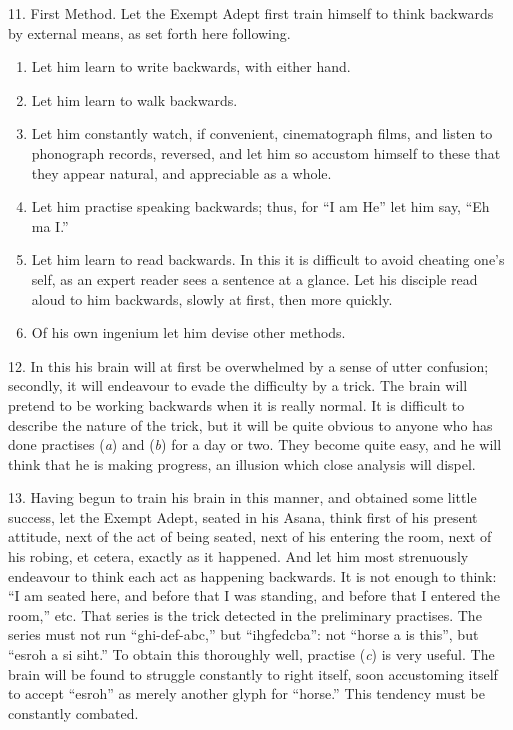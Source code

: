 11. First Method.  Let the Exempt Adept first train himself to think backwards by external means, as set forth here following.
\begin{enumerate}[label=(\alph*)]
\item Let him learn to write backwards, with either hand.
\item Let him learn to walk backwards.
\item Let him constantly watch, if convenient, cinematograph films, and listen to phonograph records, reversed, and let him so accustom himself to these that they appear natural, and appreciable as a whole.
\item Let him practise speaking backwards; thus, for \enquote{I am He} let him say, \enquote{Eh ma I.} 
\item Let him learn to read backwards. In this it is difficult to avoid cheating one’s self, as an expert reader sees a sentence at a glance. Let his disciple read aloud to him backwards, slowly at first, then more quickly.
\item Of his own ingenium let him devise other methods.
\end{enumerate}

12. In this his brain will at first be overwhelmed by a sense of utter confusion; secondly, it will endeavour to evade the difficulty by a trick. The brain will pretend to be working backwards when it is really normal. It is difficult to describe the nature of the trick, but it will be quite obvious to anyone who has done practises (\textit{a}) and (\textit{b}) for a day or two. They become quite easy, and he will think that he is making progress, an illusion which close analysis will dispel.

13. Having begun to train his brain in this manner, and obtained some little success, let the Exempt Adept, seated in his Asana, think first of his present attitude, next of the act of being seated, next of his entering the room, next of his robing, et cetera, exactly as it happened. And let him most strenuously endeavour to think each act as happening backwards. It is not enough to think: \enquote{I am seated here, and before that I was standing, and before that I entered the room,} etc. That series is the trick detected in the preliminary practises.  The series must not run \mbox{\enquote{ghi-def-abc,}} but \mbox{\enquote{ihgfedcba}}: not \enquote{horse a is this}, but \enquote{esroh a si siht.} To obtain this thoroughly well, practise (\textit{c}) is very useful. The brain will be found to struggle constantly to right itself, soon accustoming itself to accept \enquote{esroh} as merely another glyph for \enquote{horse.} This tendency must be constantly combated.

